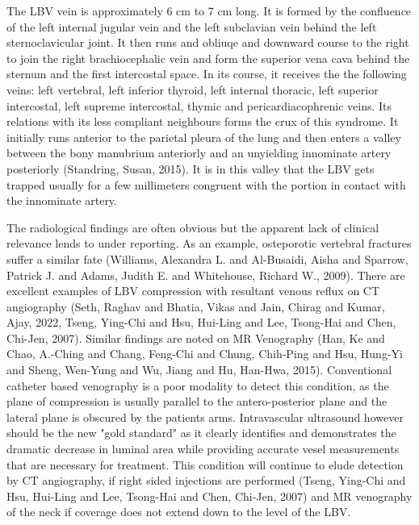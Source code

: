 \documentclass{article}
\begin{document}
The LBV vein is approximately 6 cm to 7 cm long.
It is formed by the confluence of the left internal jugular vein and the left subclavian vein behind the left sternoclavicular joint.
It then runs and obliuqe and downward course to the right to join the right brachiocephalic vein and form the superior vena cava behind the sternum and the first intercostal space.
In its course, it receives the the following veins: left  vertebral, left inferior thyroid, left internal thoracic, left superior intercostal, left supreme intercostal, thymic and pericardiacophrenic veins.
Its relations with its less compliant neighbours forms the crux of this syndrome.
It initially runs anterior to the parietal pleura of the lung and then enters a valley between the bony manubrium anteriorly and an unyielding innominate artery posteriorly (Standring, Susan, 2015).
It is in this valley that the LBV gets trapped usually for a few millimeters congruent with the portion in contact with the innominate artery.

The radiological findings are often obvious but the apparent lack of clinical relevance lends to under reporting.
As an example, osteporotic vertebral fractures suffer a similar fate (Williams, Alexandra L. and Al-Busaidi, Aisha and Sparrow, Patrick J. and Adams, Judith E. and Whitehouse, Richard W., 2009).
There are excellent examples of LBV compression with resultant venous reflux on CT angiography (Seth, Raghav and Bhatia, Vikas and Jain, Chirag and Kumar, Ajay, 2022,  Tseng, Ying-Chi and Hsu, Hui-Ling and Lee, Tsong-Hai and Chen, Chi-Jen, 2007).
Similar findings are noted on MR Venography (Han, Ke and Chao, A.-Ching and Chang, Feng-Chi and Chung, Chih-Ping and Hsu, Hung-Yi and Sheng, Wen-Yung and Wu, Jiang and Hu, Han-Hwa, 2015).
Conventional catheter based venography is a poor modality to detect this condition, as the plane of compression is usually parallel to the antero-posterior plane and the lateral plane is obscured by the patients arms.
Intravascular ultrasound however should be the new "gold standard" as it clearly identifies and demonstrates the dramatic decrease in luminal area while providing accurate vesel measurements that are necessary for treatment.
This condition will continue to elude detection by CT angiography, if right sided injections are performed (Tseng, Ying-Chi and Hsu, Hui-Ling and Lee, Tsong-Hai and Chen, Chi-Jen, 2007) and MR venography of the neck if coverage does not extend down to the level of the LBV.
\end{document}
